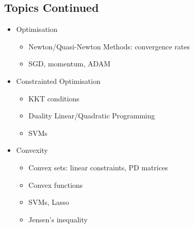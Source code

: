 \begin{slide}
  \section[-2]{Topics Continued}

  \begin{PauseHighLight}
    \begin{itemize}
    \item Optimisation
      \begin{itemize}\squeeze
      \item Newton/Quasi-Newton Methods: convergence rates\pause
      \item SGD, momentum, ADAM\pause
      \end{itemize}
    \item  Constrainted Optimisation
      \begin{itemize}\squeeze
      \item KKT conditions\pause
      \item Duality Linear/Quadratic Programming\pause
      \item SVMs\pause
      \end{itemize}
    \item Convexity
      \begin{itemize}\squeeze
      \item Convex sets: linear constraints, PD matrices\pause
      \item Convex functions\pause
      \item SVMs, Lasso\pause
      \item Jensen's inequality\pause
      \end{itemize}
    \end{itemize}
  \end{PauseHighLight}
\end{slide}


